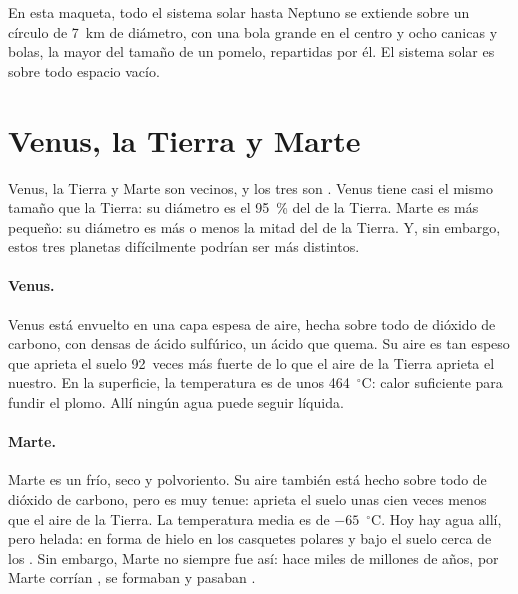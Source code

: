 En esta maqueta, todo el sistema solar hasta Neptuno se extiende sobre un
círculo de 7~km de diámetro, con una bola grande en el centro y ocho
canicas y bolas, la mayor del tamaño de un pomelo, repartidas por él. El
sistema solar es sobre todo espacio vacío.

\section{Venus, la Tierra y Marte}

Venus, la Tierra y Marte son vecinos, y los tres son .
Venus tiene casi el mismo tamaño que la Tierra: su diámetro es el 95~\% del
de la Tierra. Marte es más pequeño: su diámetro es más o menos la mitad del
de la Tierra. Y, sin embargo, estos tres planetas difícilmente podrían ser
más distintos.

\paragraph{Venus.} Venus está envuelto en una capa espesa de aire, hecha
sobre todo de dióxido de carbono, con  densas de ácido sulfúrico, un
ácido que quema. Su aire es tan espeso que aprieta el suelo 92~veces más
fuerte de lo que el aire de la Tierra aprieta el nuestro. En la superficie,
la temperatura es de unos 464~$^\circ$C: calor suficiente para fundir el
plomo. Allí ningún agua puede seguir líquida.

\paragraph{Marte.} Marte es un  frío, seco y polvoriento. Su aire
también está hecho sobre todo de dióxido de carbono, pero es muy tenue:
aprieta el suelo unas cien veces menos que el aire de la Tierra. La
temperatura media es de $-65$~$^\circ$C. Hoy hay agua allí, pero helada:
en forma de hielo en los casquetes polares y bajo el suelo cerca de los
. Sin embargo, Marte no siempre fue así: hace miles de millones de
años, por Marte corrían , se formaban  y pasaban .


